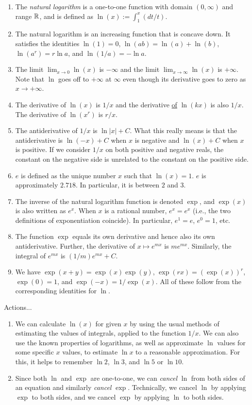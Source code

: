 \documentclass[10pt]{amsart}
\begin{document}
\begin{enumerate}
\item The {\em natural logarithm} is a one-to-one function with domain
  $(0,\infty)$ and range $\mathbb{R}$, and is defined as $\ln(x) := \int_1^x
  (dt/t)$.
\item The natural logarithm is an increasing function that is concave
  down. It satisfies the identities $\ln(1) = 0$, $\ln(ab) = \ln(a) +
  \ln(b)$, $\ln(a^r) = r\ln a$, and $\ln(1/a) = -\ln a$.
\item The limit $\lim_{x \to 0} \ln(x)$ is $-\infty$ and the limit
  $\lim_{x \to \infty} \ln(x)$ is $+\infty$. Note that $\ln$ goes off
  to $+\infty$ at $\infty$ even though its derivative goes to zero as
  $x \to + \infty$.
\item The derivative of $\ln(x)$ is $1/x$ and the derivative
  \underline{of} $\ln(kx)$ is also $1/x$. The derivative of $\ln(x^r)$
  is $r/x$.
\item The antiderivative of $1/x$ is $\ln |x| + C$. What this really
  means is that the antiderivative is $\ln(-x) + C$ when $x$ is
  negative and $\ln(x) + C$ when $x$ is positive. If we consider $1/x$
  on both positive and negative reals, the constant on the negative
  side is unrelated to the constant on the positive side.
\item $e$ is defined as the unique number $x$ such that $\ln(x) =
  1$. $e$ is approximately $2.718$. In particular, it is between $2$ and
  $3$.
\item The inverse of the natural logarithm function is denoted $\exp$,
  and $\exp(x)$ is also written as $e^x$. When $x$ is a rational
  number, $e^x = e^x$ (i.e., the two definitions of exponentiation
  coincide). In particular, $e^1 = e$, $e^0 = 1$, etc.
\item The function $\exp$ equals its own derivative and hence also its
  own antiderivative. Further, the derivative of $x \mapsto e^{mx}$ is
  $me^{mx}$. Similarly, the integral of $e^{mx}$ is $(1/m)e^{mx} +C$.
\item We have $\exp(x + y) = \exp(x)\exp(y)$, $\exp(rx) =
  (\exp(x))^r$, $\exp(0) = 1$, and $\exp(-x) = 1/\exp(x)$. All of
  these follow from the corresponding identities for $\ln$.
\end{enumerate}

Actions...

\begin{enumerate}
\item We can calculate $\ln(x)$ for given $x$ by using the usual
  methods of estimating the values of integrals, applied to the
  function $1/x$. We can also use the known properties of logarithms,
  as well as approximate $\ln$ values for some specific $x$ values, to
  estimate $\ln x$ to a reasonable approximation. For this, it helps
  to remember $\ln 2$, $\ln 3$, and $\ln 5$ or $\ln 10$.
\item Since both $\ln$ and $\exp$ are one-to-one, we can {\em cancel}
  $\ln$ from both sides of an equation and similarly {\em cancel}
  $\exp$. Technically, we cancel $\ln$ by applying $\exp$ to both
  sides, and we cancel $\exp$ by applying $\ln$ to both sides.
\end{enumerate}
\end{document}
